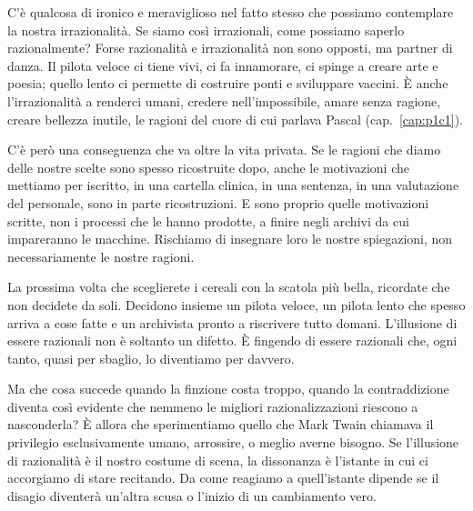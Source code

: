 C'è qualcosa di ironico e meraviglioso nel fatto stesso che possiamo contemplare la nostra irrazionalità. Se siamo così irrazionali, come possiamo saperlo razionalmente? Forse razionalità e irrazionalità non sono opposti, ma partner di danza. Il pilota veloce ci tiene vivi, ci fa innamorare, ci spinge a creare arte e poesia; quello lento ci permette di costruire ponti e sviluppare vaccini. È anche l'irrazionalità a renderci umani, credere nell'impossibile, amare senza ragione, creare bellezza inutile, le ragioni del cuore di cui parlava Pascal (cap.~\ref{cap:p1c1}).

C'è però una conseguenza che va oltre la vita privata. Se le ragioni che diamo delle nostre scelte sono spesso ricostruite dopo, anche le motivazioni che mettiamo per iscritto, in una cartella clinica, in una sentenza, in una valutazione del personale, sono in parte ricostruzioni. E sono proprio quelle motivazioni scritte, non i processi che le hanno prodotte, a finire negli archivi da cui impareranno le macchine. Rischiamo di insegnare loro le nostre spiegazioni, non necessariamente le nostre ragioni.

La prossima volta che sceglierete i cereali con la scatola più bella, ricordate che non decidete da soli. Decidono insieme un pilota veloce, un pilota lento che spesso arriva a cose fatte e un archivista pronto a riscrivere tutto domani. L'illusione di essere razionali non è soltanto un difetto. È fingendo di essere razionali che, ogni tanto, quasi per sbaglio, lo diventiamo per davvero.

Ma che cosa succede quando la finzione costa troppo, quando la contraddizione diventa così evidente che nemmeno le migliori razionalizzazioni riescono a nasconderla? È allora che sperimentiamo quello che Mark Twain chiamava il privilegio esclusivamente umano, arrossire, o meglio averne bisogno. Se l'illusione di razionalità è il nostro costume di scena, la dissonanza è l'istante in cui ci accorgiamo di stare recitando. Da come reagiamo a quell'istante dipende se il disagio diventerà un'altra scusa o l'inizio di un cambiamento vero.
